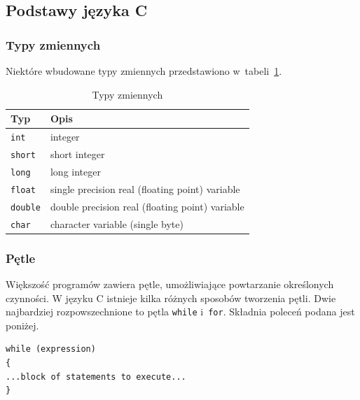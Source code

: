 \subsection{Podstawy języka C}

\subsubsection{Typy zmiennych}

Niektóre wbudowane typy zmiennych przedstawiono w~tabeli~\ref{tab:typyzmiennych}.

\begin{table}[h!]
\centering
\caption{Typy zmiennych}
\setlength{\arrayrulewidth}{1pt}
\setlength{\tabcolsep}{6pt}
\renewcommand{\arraystretch}{1.2}
\begin{tabular}{ |p{}|p{}|}
\hline \rowcolor{gray}
\textbf{Typ} & \textbf{Opis} \\ \hline
\mbox{\lstinline[style=MyBashStyle]{int}} & integer \\ \hline
\mbox{\lstinline[style=MyBashStyle]{short}} & short integer \\ \hline
\mbox{\lstinline[style=MyBashStyle]{long}} & long integer \\ \hline
\mbox{\lstinline[style=MyBashStyle]{float}} & single precision real (floating point) variable \\ \hline
\mbox{\lstinline[style=MyBashStyle]{double}} & double precision real (floating point) variable \\ \hline
\mbox{\lstinline[style=MyBashStyle]{char}} & character variable (single byte) \\ \hline
\end{tabular}
\label{tab:typyzmiennych}
\end{table}

\subsubsection{Pętle}

Większość programów zawiera pętle, umożliwiające powtarzanie określonych czynności. W języku C istnieje kilka różnych sposobów tworzenia pętli. Dwie najbardziej rozpowszechnione to pętla \lstinline[style=MyCStyle]{while} i~\lstinline[style=MyCStyle]{for}. Składnia poleceń podana jest poniżej.


\begin{lstlisting}[style=MyCStyle]
while (expression)
{
...block of statements to execute...
}
\end{lstlisting}

